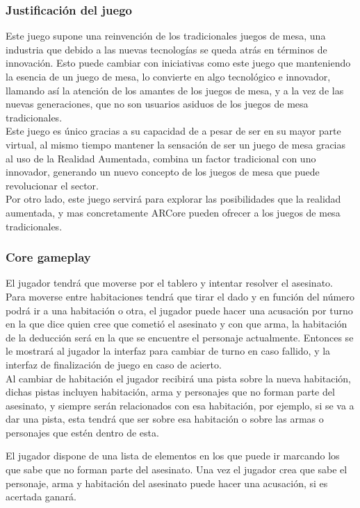 \subsubsection{Justificación del juego}
Este juego supone una reinvención de los tradicionales juegos de mesa, una industria que debido a las nuevas tecnologías se queda atrás en términos de innovación. Esto puede cambiar con iniciativas como este juego que manteniendo la esencia de un juego de mesa, lo convierte en algo tecnológico e innovador, llamando así la atención de los amantes de los juegos de mesa, y a la vez de las nuevas generaciones, que no son usuarios asiduos de los juegos de mesa tradicionales.\\

Este juego es único gracias a su capacidad de a pesar de ser en su mayor parte virtual, al mismo tiempo mantener la sensación de ser un juego de mesa gracias al uso de la Realidad Aumentada, combina un factor tradicional con uno innovador, generando un nuevo concepto de los juegos de mesa que puede revolucionar el sector.\\

Por otro lado, este juego servirá para explorar las posibilidades que la realidad aumentada, y mas concretamente ARCore pueden ofrecer a los juegos de mesa tradicionales.

\subsubsection{Core gameplay}
El jugador tendrá que moverse por el tablero y intentar resolver el asesinato. Para moverse entre habitaciones tendrá que tirar el dado y en función del número podrá ir a una habitación o otra, el jugador puede hacer una acusación por turno en la que dice quien cree que cometió el asesinato y con que arma, la habitación de la deducción será en la que se encuentre el personaje actualmente. Entonces se le mostrará al jugador la interfaz para cambiar de turno en caso fallido, y la interfaz de finalización de juego en caso de acierto.\\

Al cambiar de habitación el jugador recibirá una pista sobre la nueva habitación, dichas pistas incluyen habitación, arma y personajes que no forman parte del asesinato, y siempre serán relacionados con esa habitación, por ejemplo, si se va a dar una pista, esta tendrá que ser sobre esa habitación o sobre las armas o personajes que estén dentro de esta.

El jugador dispone de una lista de elementos en los que puede ir marcando los que sabe que no forman parte del asesinato. Una vez el jugador crea que sabe el personaje, arma y habitación del asesinato puede hacer una acusación, si es acertada ganará.

